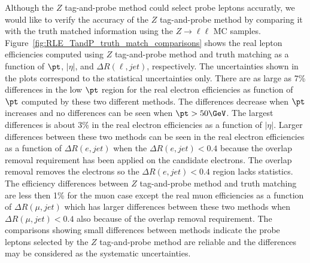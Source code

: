 Although the $Z$ tag-and-probe method could select probe leptons accuratly, we would like to verify the accuracy of the $Z$ tag-and-probe method by comparing it with the truth matched information using the $Z\to\ell\ell$ MC samples.
Figure~\ref{fig:RLE_TandP_truth_match_comparisons} shows the real lepton efficiencies computed using $Z$ tag-and-probe method and truth matching as a function of $\pt$, $|\eta|$, and $\Delta R(\ell, jet)$, respectively.
The uncertainties shown in the plots correspond to the statistical uncertainties only.
There are as large as 7\% differences in the low $\pt$ region for the real electron efficiencies as function of $\pt$ computed by these two different methods.
The differences decrease when $\pt$ increases and no differences can be seen when $\pt>50 \GeV$.
The largest differences is about 3\% in the real electron efficiencies as a function of $|\eta|$.
Larger differences between these two methods can be seen in the real electron efficiencies as a function of $\Delta R(e, jet)$ when the $\Delta R(e, jet)<0.4$ because the overlap removal requirement has been applied on the candidate electrons.
The overlap removal removes the electrons so the $\Delta R(e, jet)<0.4$ region lacks statistics.
The efficiency differences between $Z$ tag-and-probe method and truth matching are less then 1\% for the muon case except the real muon efficiencies as a function of $\Delta R(\mu, jet)$ which has larger differences between these two methods when $\Delta R(\mu, jet)<0.4$ also because of the overlap removal requirement.
The comparisons showing small differences between methods indicate the probe leptons selected by the $Z$ tag-and-probe method are reliable and the differences may be considered as the systematic uncertainties.

